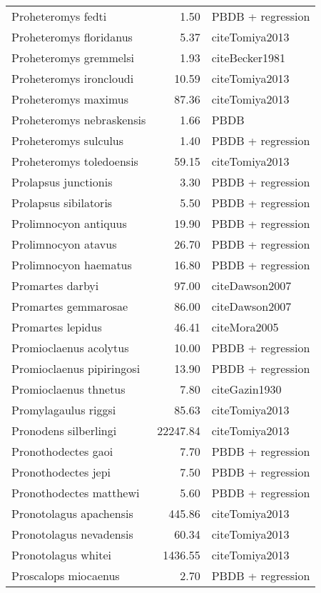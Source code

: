 \begin{table}[ht]
\begin{tabular}{lrl}
  Proheteromys fedti & 1.50 & PBDB + regression \\ 
  Proheteromys floridanus & 5.37 & cite{Tomiya2013} \\ 
  Proheteromys gremmelsi & 1.93 & cite{Becker1981} \\ 
  Proheteromys ironcloudi & 10.59 & cite{Tomiya2013} \\ 
  Proheteromys maximus & 87.36 & cite{Tomiya2013} \\ 
  Proheteromys nebraskensis & 1.66 & PBDB \\ 
  Proheteromys sulculus & 1.40 & PBDB + regression \\ 
  Proheteromys toledoensis & 59.15 & cite{Tomiya2013} \\ 
  Prolapsus junctionis & 3.30 & PBDB + regression \\ 
  Prolapsus sibilatoris & 5.50 & PBDB + regression \\ 
  Prolimnocyon antiquus & 19.90 & PBDB + regression \\ 
  Prolimnocyon atavus & 26.70 & PBDB + regression \\ 
  Prolimnocyon haematus & 16.80 & PBDB + regression \\ 
  Promartes darbyi & 97.00 & cite{Dawson2007} \\ 
  Promartes gemmarosae & 86.00 & cite{Dawson2007} \\ 
  Promartes lepidus & 46.41 & cite{Mora2005} \\ 
  Promioclaenus acolytus & 10.00 & PBDB + regression \\ 
  Promioclaenus pipiringosi & 13.90 & PBDB + regression \\ 
  Promioclaenus thnetus & 7.80 & cite{Gazin1930} \\ 
  Promylagaulus riggsi & 85.63 & cite{Tomiya2013} \\ 
  Pronodens silberlingi & 22247.84 & cite{Tomiya2013} \\ 
  Pronothodectes gaoi & 7.70 & PBDB + regression \\ 
  Pronothodectes jepi & 7.50 & PBDB + regression \\ 
  Pronothodectes matthewi & 5.60 & PBDB + regression \\ 
  Pronotolagus apachensis & 445.86 & cite{Tomiya2013} \\ 
  Pronotolagus nevadensis & 60.34 & cite{Tomiya2013} \\ 
  Pronotolagus whitei & 1436.55 & cite{Tomiya2013} \\ 
  Proscalops miocaenus & 2.70 & PBDB + regression \\ 

\end{tabular}
\end{table}

